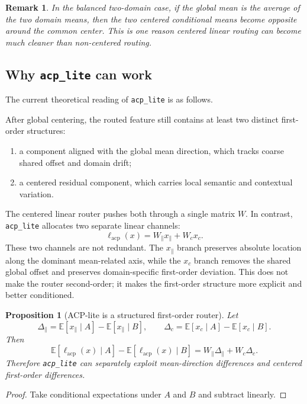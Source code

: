 \documentclass[11pt]{article}
\newtheorem{proposition}{Proposition}
\newtheorem{remark}{Remark}
\begin{document}
\begin{remark}
In the balanced two-domain case, if the global mean is the average of the two domain means, then the two centered conditional means become opposite around the common center. This is one reason centered linear routing can become much cleaner than non-centered routing.
\end{remark}

\subsection{Why \texttt{acp\_lite} can work}

The current theoretical reading of \texttt{acp\_lite} is as follows.

After global centering, the routed feature still contains at least two distinct first-order structures:
\begin{enumerate}
    \item a component aligned with the global mean direction, which tracks coarse shared offset and domain drift;
    \item a centered residual component, which carries local semantic and contextual variation.
\end{enumerate}

The centered linear router pushes both through a single matrix $W$. In contrast, \texttt{acp\_lite} allocates two separate linear channels:
\[
\ell_{\mathrm{acp}}(x)=W_{\parallel}x_{\parallel}+W_c x_c.
\]
These two channels are not redundant. The $x_{\parallel}$ branch preserves absolute location along the dominant mean-related axis, while the $x_c$ branch removes the shared global offset and preserves domain-specific first-order deviation. This does not make the router second-order; it makes the first-order structure more explicit and better conditioned.

\begin{proposition}[ACP-lite is a structured first-order router]
Let
\[
\Delta_{\parallel}
=
\mathbb{E}[x_{\parallel}\mid A]-\mathbb{E}[x_{\parallel}\mid B],
\qquad
\Delta_c
=
\mathbb{E}[x_c\mid A]-\mathbb{E}[x_c\mid B].
\]
Then
\[
\mathbb{E}[\ell_{\mathrm{acp}}(x)\mid A]-\mathbb{E}[\ell_{\mathrm{acp}}(x)\mid B]
=
W_{\parallel}\Delta_{\parallel}+W_c\Delta_c.
\]
Therefore \texttt{acp\_lite} can separately exploit mean-direction differences and centered first-order differences.
\end{proposition}

\begin{proof}
Take conditional expectations under $A$ and $B$ and subtract linearly.
\end{proof}
\end{document}
